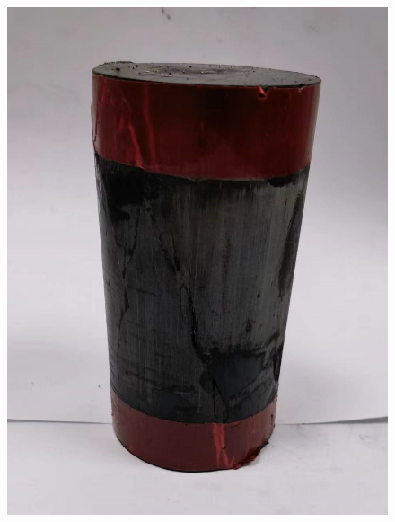 \begin{figure}[ht!]
{\begin{minipage}{6cm}
            \includegraphics[width=1\textwidth]{img/chap2/D-2.jpg}
        \end{minipage}
    }
	

\end{figure}
